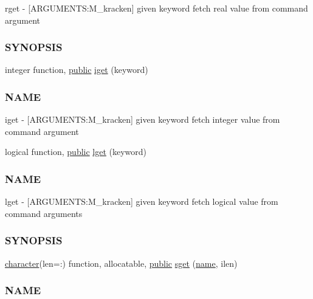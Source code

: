 \begin{DoxyCompactItemize}
\begin{DoxyCompactList}
rget -\/ \mbox{[}A\+R\+G\+U\+M\+E\+N\+TS\+:M\+\_\+kracken\mbox{]} given keyword fetch real value from command argument \subsubsection*{S\+Y\+N\+O\+P\+S\+IS}\end{DoxyCompactList}\item 
integer function, \hyperlink{M__stopwatch_83_8txt_a2f74811300c361e53b430611a7d1769f}{public} \hyperlink{namespacem__kracken_a420718890eac378e5cd047dd0b477424}{iget} (keyword)
\begin{DoxyCompactList}\small\item\em \subsubsection*{N\+A\+ME}

iget -\/ \mbox{[}A\+R\+G\+U\+M\+E\+N\+TS\+:M\+\_\+kracken\mbox{]} given keyword fetch integer value from command argument \end{DoxyCompactList}\item 
logical function, \hyperlink{M__stopwatch_83_8txt_a2f74811300c361e53b430611a7d1769f}{public} \hyperlink{namespacem__kracken_a7141acd7a00c1a5aa5f90612a0414b63}{lget} (keyword)
\begin{DoxyCompactList}\small\item\em \subsubsection*{N\+A\+ME}

lget -\/ \mbox{[}A\+R\+G\+U\+M\+E\+N\+TS\+:M\+\_\+kracken\mbox{]} given keyword fetch logical value from command arguments \subsubsection*{S\+Y\+N\+O\+P\+S\+IS}\end{DoxyCompactList}\item 
\hyperlink{option__stopwatch_83_8txt_abd4b21fbbd175834027b5224bfe97e66}{character}(len=\+:) function, allocatable, \hyperlink{M__stopwatch_83_8txt_a2f74811300c361e53b430611a7d1769f}{public} \hyperlink{namespacem__kracken_a9a64192326816b0b9badcc11506628ee}{sget} (\hyperlink{M__stopwatch_83_8txt_a3f508a893ae4c3b397b4383e33b9bcae}{name}, ilen)
\begin{DoxyCompactList}\small\item\em \subsubsection*{N\+A\+ME}


\end{DoxyCompactList}
\end{DoxyCompactItemize}
